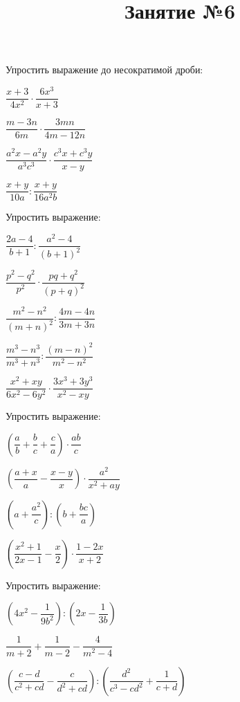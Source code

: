 \newpage
\title{Занятие №6}
\begin{listofex}
	\item Упростить выражение до несократимой дроби:
	\begin{enumcols}[itemcolumns=3]
		\item \( \dfrac{x+3}{4x^2}\cdot\dfrac{6x^3}{x+3} \)
		\item \( \dfrac{m-3n}{6m}\cdot\dfrac{3mn}{4m-12n} \)
		\item \( \dfrac{a^2x-a^2y}{a^3c^3}\cdot\dfrac{c^3x+c^3y}{x-y} \)
		\item \( \dfrac{x+y}{10a}:\dfrac{x+y}{16a^2b} \)
	\end{enumcols}
	\item Упростить выражение:
	\begin{enumcols}[itemcolumns=3]
		\item \( \dfrac{2a-4}{b+1}:\dfrac{a^2-4}{(b+1)^2} \)
		\item \( \dfrac{p^2-q^2}{p^2}\cdot\dfrac{pq+q^2}{(p+q)^2} \)
		\item \( \dfrac{m^2-n^2}{(m+n)^2}:\dfrac{4m-4n}{3m+3n} \)
		\item \( \dfrac{m^3-n^3}{m^3+n^3}:\dfrac{(m-n)^2}{m^2-n^2} \)
		\item \( \dfrac{x^2+xy}{6x^2-6y^2}\cdot\dfrac{3x^3+3y^3}{x^2-xy} \)
	\end{enumcols}
	\item Упростить выражение:
	\begin{enumcols}[itemcolumns=2]
		\item \( \left( \dfrac{a}{b}+\dfrac{b}{c}+\dfrac{c}{a} \right)\cdot\dfrac{ab}{c} \)
		\item \( \left( \dfrac{a+x}{a}-\dfrac{x-y}{x} \right)\cdot\dfrac{a^2}{x^2+ay} \)
		\item \( \left( a+\dfrac{a^2}{c} \right):\left( b+\dfrac{bc}{a} \right) \)
		\item \( \left( \dfrac{x^2+1}{2x-1}-\dfrac{x}{2} \right)\cdot\dfrac{1-2x}{x+2} \)
	\end{enumcols}
	\item Упростить выражение:
	\begin{enumcols}[itemcolumns=2]
		\item \( \left( 4x^2-\dfrac{1}{9b^2} \right):\left( 2x-\dfrac{1}{3b} \right) \)
		\item \( \dfrac{1}{m+2}+\dfrac{1}{m-2}-\dfrac{4}{m^2-4} \)
		\item \( \left( \dfrac{c-d}{c^2+cd}-\dfrac{c}{d^2+cd} \right):\left( \dfrac{d^2}{c^3-cd^2}+\dfrac{1}{c+d} \right) \)

\end{enumcols}
\end{listofex}

